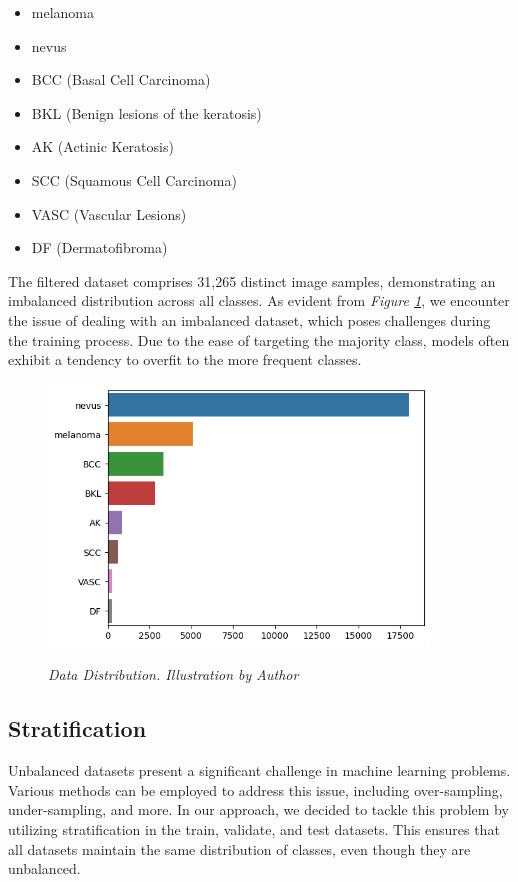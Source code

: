 \begin{itemize}
  \item melanoma
  \item nevus
  \item BCC (Basal Cell Carcinoma)
  \item BKL (Benign lesions of the keratosis)
  \item AK (Actinic Keratosis)
  \item SCC (Squamous Cell Carcinoma)
  \item VASC (Vascular Lesions)
  \item DF (Dermatofibroma)
\end{itemize}

The filtered dataset comprises 31,265 distinct image samples, demonstrating an
imbalanced distribution across all classes. As evident from \textit{Figure
\ref{fig:hole-dataset-distribution}}, we encounter the issue of dealing with an
imbalanced dataset, which poses challenges during the training process. Due to
the ease of targeting the majority class, models often exhibit a tendency to
overfit to the more frequent classes.

\begin{figure}[H]
  \centering
  \includegraphics[width=0.9\textwidth]{imatges/methodological_contribution/hole-dataset-diagnosis.png}
  \caption[Data Distribution]{\textit{Data Distribution. Illustration by Author}}
  {\label{fig:hole-dataset-distribution}}
\end{figure}

\subsection{Stratification}

Unbalanced datasets present a significant challenge in machine learning
problems. Various methods can be employed to address this issue, including
over-sampling, under-sampling, and more. In our approach, we decided to tackle
this problem by utilizing stratification in the train, validate, and test
datasets. This ensures that all datasets maintain the same distribution of
classes, even though they are unbalanced. \\

